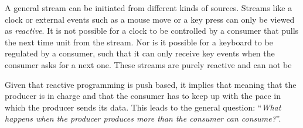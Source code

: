 \HRule


A general stream can be initiated from different kinds of sources. Streams like a clock or external events such as a mouse move or a key press can only be viewed as \emph{reactive}. It is not possible for a clock to be controlled by a consumer that pulls the next time unit from the stream. Nor is it possible for a keyboard to be regulated by a consumer, such that it can only receive key events when the consumer asks for a next one. These streams are purely reactive and can not be 

Given that reactive programming is push based, it implies that meaning that the producer is in charge and that the consumer has to keep up with the pace in which the producer sends its data. This leads to the general question: ``\emph{What happens when the producer produces more than the consumer can consume?}''. 